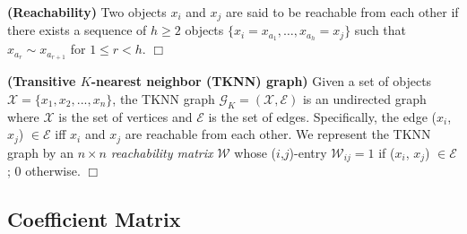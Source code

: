 
\begin{definition}
\label{def:reachability}
\textbf{(Reachability)}
Two objects $x_i$ and $x_j$ are said to be reachable from each other
if there exists a sequence of $h \geq 2$ objects 
 $\{x_i = x_{a_1}, \ldots, x_{a_h} = x_j\}$ such that
 $x_{a_r} \sim x_{a_{r+1}}$ for $1 \leq r < h$.
 \hfill$\Box$
\end{definition}

\begin{definition}
\label{def:trans_relation}
\textbf{(Transitive $K$-nearest neighbor (TKNN) graph)}
Given a set of objects $\mathcal{X} = \{x_1, x_2,..., x_n\}$,
the TKNN graph $\mathcal{G}_K = (\mathcal{X},\mathcal{E})$
is an undirected graph
where $\mathcal{X}$ is the set of vertices and $\mathcal{E}$ is the set of edges.
Specifically, the edge ($x_i$, $x_j$) $\in \mathcal{E}$
iff $x_i$ and $x_j$ are reachable from each other.
We represent the TKNN graph by an $n \times n$ {\it reachability matrix}
$\mathcal{W}$ 
whose ($i$,$j$)-entry $\mathcal{W}_{ij} = 1$ if ($x_i$, $x_j$) $\in \mathcal{E}$; 0 otherwise.
\hfill$\Box$
\end{definition}


 
\subsection*{Coefficient Matrix}

